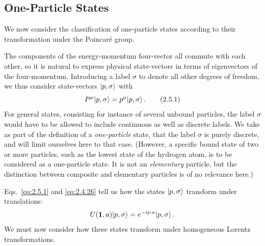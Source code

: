 \subsection{One-Particle States}

We now consider the classification of one-particle states according to their
transformation under the Poincar\'e group.

The components of the energy-momentum four-vector all commute with each other,
so it is natural to express physical state-vectors in terms of eigenvectors of
the four-momentum. Introducing a label $\sigma$ to denote all other degrees of
freedom, we thus consider state-vectors $\lvert p,\sigma\rangle$ with
\begin{equation}
P^\mu\lvert p,\sigma\rangle=p^\mu\lvert p,\sigma\rangle\,.
\tag{2.5.1}\label{eq:2.5.1}
\end{equation}
For general states, consisting for instance of several unbound particles, the
label $\sigma$ would have to be allowed to include continuous as well as
discrete labels. We take as part of the definition of a \emph{one-particle}
state, that the label $\sigma$ is purely discrete, and will limit ourselves
here to that case. (However, a specific bound state of two or more particles,
such as the lowest state of the hydrogen atom, is to be considered as a
one-particle state. It is not an \emph{elementary} particle, but the distinction
between composite and elementary particles is of no relevance here.)

Eqs.~\eqref{eq:2.5.1} and \eqref{eq:2.4.26} tell us how the states $\lvert p,\sigma\rangle$ transform
under translations:
\[
U(\mathbf{1},a)\lvert p,\sigma\rangle=e^{-ip\cdot a}\lvert p,\sigma\rangle\,.
\]
We must now consider how these states transform under homogeneous Lorentz
transformations.

